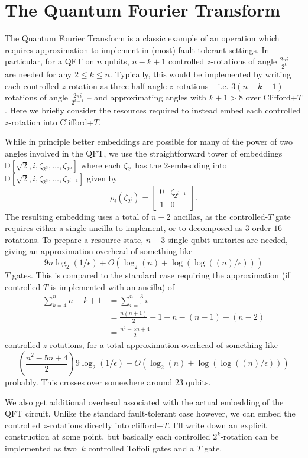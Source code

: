 \documentclass{article}
\theoremstyle{definition}
\theoremstyle{theorem}
\theoremstyle{remark}
\begin{document}
\section{The Quantum Fourier Transform}

The Quantum Fourier Transform is a classic example of an operation which requires approximation to implement in (most) fault-tolerant settings. In particular, for a QFT on $n$ qubits, $n-k+1$ controlled $z$-rotations of angle $\frac{2\pi i}{2^k}$ are needed for any $2\leq k \leq n$. Typically, this would be implemented by writing each controlled $z$-rotation as three half-angle $z$-rotations -- i.e. $3(n-k+1)$ rotations of angle $\frac{2\pi i}{2^{k+1}}$ -- and approximating angles with $k+1>8$ over Clifford+$T$. Here we briefly consider the resources required to instead embed each controlled $z$-rotation into Clifford+$T$.

While in principle better embeddings are possible for many of the power of two angles involved in the QFT, we use the straightforward tower of embeddings $\mathbb{D}[\sqrt{2},i,\zeta_{2^3},\dots,\zeta_{2^n}]$ where each  $\zeta_{2^i}$ has the $2$-embedding into $\mathbb{D}[\sqrt{2},i,\zeta_{2^3},\dots,\zeta_{2^{i-1}}]$ given by
\[
	\rho_i(\zeta_{2^i}) = \begin{bmatrix} 0 & \zeta_{2^{i-1}} \\ 1 & 0 \end{bmatrix}.
\]
The resulting embedding uses a total of $n-2$ ancillas, as the controlled-$T$ gate requires either a single ancilla to implement, or to decomposed as $3$ order $16$ rotations. To prepare a resource state, $n-3$ single-qubit unitaries are needed, giving an approximation overhead of something like
\[
	9n\log_2(1/\epsilon) + O(\log_2(n) + \log(\log((n)/\epsilon)))
\]
$T$ gates. This is compared to the standard case requiring the approximation (if controlled-$T$ is implemented with an ancilla) of
\begin{align*}
	\sum_{k=4}^n n-k+1 
		&= \sum_{i=1}^{n-3} i \\
		&= \frac{n(n+1)}{2} - 1 - n - (n-1) - (n-2) \\
		&= \frac{n^2 -5n + 4}{2}
\end{align*}
controlled $z$-rotations, for a total approximation overhead of something like
\[
	\left(\frac{n^2 -5n + 4}{2}\right)9\log_2(1/\epsilon) + O(\log_2(n) + \log(\log((n)/\epsilon)))
\]
probably. This crosses over somewhere around $23$ qubits.

We also get additional overhead associated with the actual embedding of the QFT circuit. Unlike the standard fault-tolerant case however, we can embed the controlled $z$-rotations directly into clifford+$T$. I'll write down an explicit construction at some point, but basically each controlled $2^k$-rotation can be implemented as two $~k$ controlled Toffoli gates and a $T$ gate.
\end{document}
